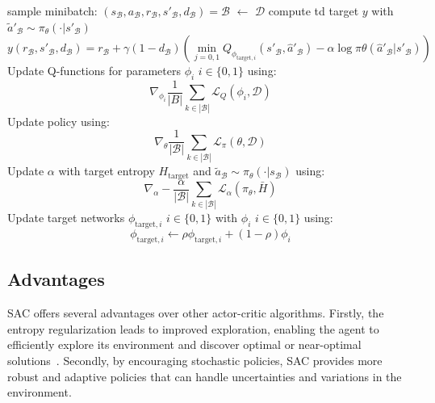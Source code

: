 \begin{algorithm}
\begin{algorithmic}
			\State{} sample minibatch: $(s_\mathcal{B}, a_\mathcal{B}, r_\mathcal{B}, s'_\mathcal{B}, d_\mathcal{B}) = \mathcal{B}$ $\leftarrow$ $\mathcal{D}$ 
			\State{} compute td target $y$ with $\tilde{a}'_\mathcal{B} \sim \pi_\theta(\cdot|s'_\mathcal{B})$
			\begin{equation}\label{eqn:td-target-batch}
				y(r_\mathcal{B}, s'_\mathcal{B}, d_\mathcal{B}) = r_\mathcal{B} + \gamma(1 - d_\mathcal{B}) \left(\min_{j=0,1}Q_{\phi_{\text{target}, i}}(s'_\mathcal{B}, \hat{a}'_\mathcal{B}) - \alpha \log \pi\theta(\hat{a}'_\mathcal{B}| s'_\mathcal{B})\right)
			\end{equation}
			\State{} Update Q-functions for parameters $\phi_i$ $i \in \{0, 1\}$ using:
			\begin{equation}\label{eqn:q-update}
				\nabla_{\phi_i} \frac{1}{|B|} \sum_{k \in |\mathcal{B}|}\mathcal{L}_Q(\phi_i, \mathcal{D})   
			\end{equation}
			\State{} Update policy using:
			\begin{equation}\label{eqn:policy-update}
			   \nabla_{\theta} \frac{1}{|\mathcal{B}|}\sum_{k \in |\mathcal{B}|}\mathcal{L}_\pi(\theta, \mathcal{D})
			\end{equation}
			\State{} Update $\alpha$ with target entropy $H_\text{target}$ and $\tilde{a}_\mathcal{B} \sim \pi_\theta(\cdot|s_\mathcal{B})$ using:
			\begin{equation*}
				\nabla_\alpha -\frac{\alpha}{|\mathcal{B}|} \sum_{k \in |\mathcal{B}|} \mathcal{L}_\alpha(\pi_\theta, \bar{H})
			\end{equation*}
			\State{} Update target networks $\phi_{\text{target}, i}$ $i \in \{0, 1\}$ with $\phi_i$ $i \in \{0, 1\}$ using:
			\begin{equation*}
				\phi_{\text{target}, i} \leftarrow \rho \phi_{\text{target}, i} + (1 - \rho) \phi_i
			\end{equation*}
			\EndFor{}
			\EndIf{}
			\EndFor{}
	\end{algorithmic}
\end{algorithm}

\subsection{Advantages}

SAC offers several advantages over other actor-critic algorithms. Firstly, the entropy regularization leads to improved exploration, enabling the agent to efficiently explore its environment and discover optimal or near-optimal solutions~\cite{SAC_Paper}. Secondly, by encouraging stochastic policies, SAC provides more robust and adaptive policies that can handle uncertainties and variations in the environment.

